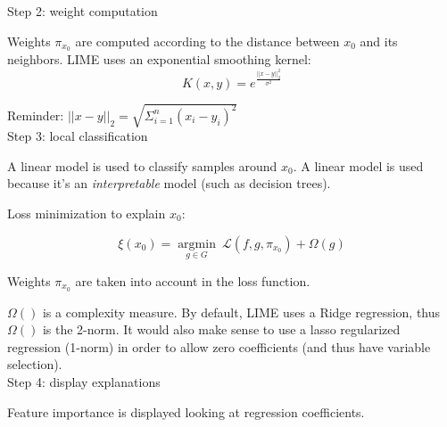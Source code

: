 Step 2: weight computation

Weights $\pi_{x_0}$ are computed according to the distance between $x_0$ and its neighbors. LIME uses an exponential smoothing kernel:
$$K(x,y) = e^{\frac{||x-y||^2_2}{\sigma^2}}$$

Reminder: $||x-y||_2 = \sqrt{\Sigma_{i=1}^n (x_i - y_i)^2}$ \\

Step 3: local classification

A linear model is used to classify samples around $x_0$. A linear model is used because it's an \textit{interpretable} model (such as decision trees).

Loss minimization to explain $x_0$:

$$\xi(x_0) = \underset{g \in G}{\operatorname{argmin}} ~\mathcal{L} (f, g, \pi_{x_0}) + \Omega(g)$$

Weights $\pi_{x_0}$ are taken into account in the loss function.

$\Omega()$ is a complexity measure. By default, LIME uses a Ridge regression, thus $\Omega()$ is the 2-norm. It would also make sense to use a lasso regularized regression (1-norm) in order to allow zero coefficients (and thus have variable selection). \\

Step 4: display explanations

Feature importance is displayed looking at regression coefficients. \\ \\